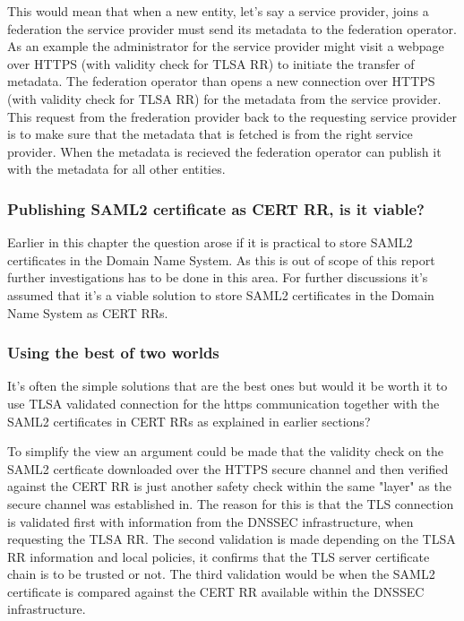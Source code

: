 This would mean that when a new entity, let's say a service provider, joins a federation the service provider must send its metadata to the federation operator.
As an example the administrator for the service provider might visit a webpage over HTTPS (with validity check for TLSA RR) to initiate the transfer of metadata.
The federation operator than opens a new connection over HTTPS (with validity check for TLSA RR) for the metadata from the service provider.
This request from the frederation provider back to the requesting service provider is to make sure that the metadata that is fetched is from the right service provider. 
When the metadata is recieved the federation operator can publish it with the metadata for all other entities.


\subsubsection{Publishing SAML2 certificate as CERT RR, is it viable?}
\label{subsec:saml2-certs-in-cert-rr}
Earlier in this chapter the question arose if it is practical to store SAML2 certificates in the Domain Name System.
As this is out of scope of this report further investigations has to be done in this area.
For further discussions it's assumed that it's a viable solution to store SAML2 certificates in the Domain Name System as CERT RRs.

\subsubsection{Using the best of two worlds}
It's often the simple solutions that are the best ones but would it be worth it to use TLSA validated connection for the https communication together with the SAML2 certificates in CERT RRs as explained in earlier sections?

To simplify the view an argument could be made that the validity check on the SAML2 certficate downloaded over the HTTPS secure channel and then verified against the CERT RR is just another safety check within the same "layer" as the secure channel was established in.
The reason for this is that the TLS connection is validated first with information from the DNSSEC infrastructure, when requesting the TLSA RR.
The second validation is made depending on the TLSA RR information and local policies, it confirms that the TLS server certificate chain is to be trusted or not.
The third validation would be when the SAML2 certificate is compared against the CERT RR available within the DNSSEC infrastructure.

